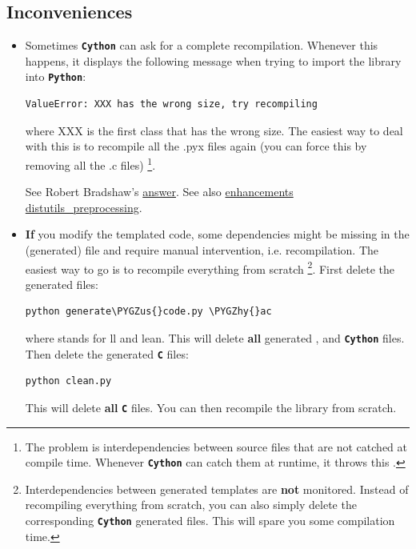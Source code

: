 \documentclass[letterpaper,10pt,english]{sphinxmanual}
\def\PYGZus{\char`\_}
\def\PYGZhy{\char`\-}
\begin{document}
\subsection{Inconveniences}
\label{installation:inconveniences}\begin{itemize}
\item {} 
Sometimes \textbf{\texttt{Cython}} can ask for a complete recompilation.
Whenever this happens, it displays the following message when trying to import the library
into \textbf{\texttt{Python}}:

\begin{Verbatim}[commandchars=\\\{\}]
ValueError: XXX has the wrong size, try recompiling
\end{Verbatim}

where XXX is the first class that has the wrong size. The easiest way to deal with this is to recompile all the .pyx files again (you can force this by removing
all the .c files) \footnote{
The problem is interdependencies between source files that are not catched at compile time. Whenever \textbf{\texttt{Cython}} can catch them at runtime, it throws this .
}.

See Robert Bradshaw's \href{https://groups.google.com/forum/?hl=en\#!topic/cython-users/cOAVM0whJkY}{answer}.
See also \href{https://github.com/cython/cython/wiki/enhancements-distutils\_preprocessing}{enhancements distutils\_preprocessing}.

\item {} 
\textbf{If} you modify the templated code, some dependencies might be missing in the (generated)  file and require manual intervention,
i.e. recompilation. The easiest way to go is to recompile everything from scratch \footnote{
Interdependencies between generated templates are \textbf{not} monitored. Instead of recompiling everything from scratch, you can also simply delete the corresponding \textbf{\texttt{Cython}} generated files. This will spare you some compilation time.
}. First delete the generated files:

\begin{Verbatim}[commandchars=\\\{\}]
python generate\PYGZus{}code.py \PYGZhy{}ac
\end{Verbatim}

where  stands for ll and lean. This will delete \textbf{all} generated ,  and  \textbf{\texttt{Cython}} files. Then delete the generated \textbf{\texttt{C}} files:

\begin{Verbatim}[commandchars=\\\{\}]
python clean.py
\end{Verbatim}

This will delete \textbf{all} \textbf{\texttt{C}}  files. You can then recompile the library from scratch.

\end{itemize}
\end{document}
